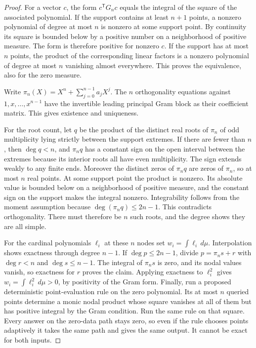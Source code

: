 \documentclass[11pt,oneside,openany]{book}
\theoremstyle{plain}
\theoremstyle{definition}
\theoremstyle{remark}
\begin{document}
\begin{proof}
For a vector \(c\), the form \(c^\mathsf{T}G_nc\) equals
the integral of the square of the associated polynomial.
If the support contains at least \(n+1\) points, a nonzero
polynomial of degree at most \(n\) is nonzero at some
support point. By continuity its square is bounded below
by a positive number on a neighborhood of positive measure.
The form is therefore positive for nonzero \(c\).
If the support has at most \(n\) points, the product of
the corresponding linear factors is a nonzero polynomial
of degree at most \(n\) vanishing almost everywhere.
This proves the equivalence, also for the zero measure.

Write \(\pi_n(X)=X^n+\sum_{j=0}^{n-1}a_jX^j\). The
\(n\) orthogonality equations against \(1,x,\ldots,x^{n-1}\)
have the invertible leading principal Gram block as their
coefficient matrix. This gives existence and uniqueness.

For the root count, let \(q\) be the product of the distinct
real roots of \(\pi_n\) of odd multiplicity lying strictly
between the support extremes. If there are fewer than \(n\),
then \(\deg q<n\), and \(\pi_n q\) has a constant sign on
the open interval between the extremes because its interior
roots all have even multiplicity. The sign extends weakly
to any finite ends. Moreover the distinct zeros of \(\pi_n q\)
are zeros of \(\pi_n\), so at most \(n\) real points.
At some support point the product is nonzero. Its absolute
value is bounded below on a neighborhood of positive measure,
and the constant sign on the support makes the integral
nonzero. Integrability follows from the moment assumption
because \(\deg(\pi_n q)\le2n-1\). This contradicts
orthogonality. There must therefore be \(n\) such roots,
and the degree shows they are all simple.

For the cardinal polynomials \(\ell_i\) at these \(n\)
nodes set \(w_i=\int\ell_i\,d\mu\). Interpolation shows
exactness through degree \(n-1\). If \(\deg p\le2n-1\),
divide \(p=\pi_n s+r\) with \(\deg r<n\) and
\(\deg s\le n-1\). The integral of \(\pi_n s\) is zero,
and its nodal values vanish, so exactness for \(r\) proves
the claim. Applying exactness to \(\ell_i^2\) gives
\(w_i=\int\ell_i^2\,d\mu>0\), by positivity of the Gram
form. Finally, run a proposed deterministic point-evaluation rule
on the zero polynomial. Its at most \(n\) queried points determine
a monic nodal product whose square vanishes at all of them but has
positive integral by the Gram condition. Run the same rule on that
square. Every answer on the zero-data path stays zero, so even if
the rule chooses points adaptively it takes the same path and gives
the same output. It cannot be exact for both inputs.
\end{proof}
\end{document}
